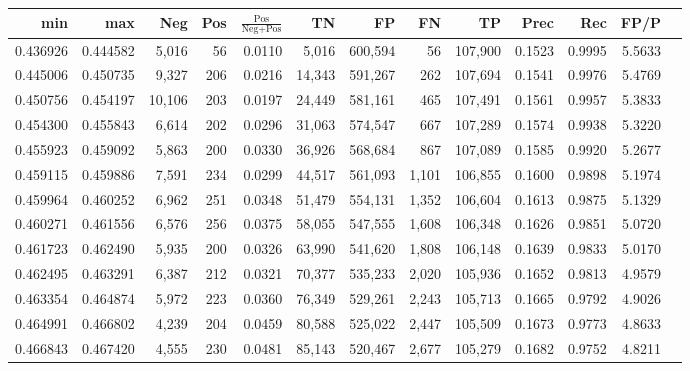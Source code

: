 \begin{tabular}{rrrrrrrrrrrrr}
\toprule
     min &      max &    Neg &   Pos & $\frac{\text{Pos}}{\text{Neg}+\text{Pos}}$ &      TN &      FP &      FN &      TP &   Prec &    Rec &   FP/P \\
\midrule
0.436926 & 0.444582 &  5,016 &    56 &                                     0.0110 &   5,016 & 600,594 &      56 & 107,900 & 0.1523 & 0.9995 & 5.5633 \\
0.445006 & 0.450735 &  9,327 &   206 &                                     0.0216 &  14,343 & 591,267 &     262 & 107,694 & 0.1541 & 0.9976 & 5.4769 \\
0.450756 & 0.454197 & 10,106 &   203 &                                     0.0197 &  24,449 & 581,161 &     465 & 107,491 & 0.1561 & 0.9957 & 5.3833 \\
0.454300 & 0.455843 &  6,614 &   202 &                                     0.0296 &  31,063 & 574,547 &     667 & 107,289 & 0.1574 & 0.9938 & 5.3220 \\
0.455923 & 0.459092 &  5,863 &   200 &                                     0.0330 &  36,926 & 568,684 &     867 & 107,089 & 0.1585 & 0.9920 & 5.2677 \\
0.459115 & 0.459886 &  7,591 &   234 &                                     0.0299 &  44,517 & 561,093 &   1,101 & 106,855 & 0.1600 & 0.9898 & 5.1974 \\
0.459964 & 0.460252 &  6,962 &   251 &                                     0.0348 &  51,479 & 554,131 &   1,352 & 106,604 & 0.1613 & 0.9875 & 5.1329 \\
0.460271 & 0.461556 &  6,576 &   256 &                                     0.0375 &  58,055 & 547,555 &   1,608 & 106,348 & 0.1626 & 0.9851 & 5.0720 \\
0.461723 & 0.462490 &  5,935 &   200 &                                     0.0326 &  63,990 & 541,620 &   1,808 & 106,148 & 0.1639 & 0.9833 & 5.0170 \\
0.462495 & 0.463291 &  6,387 &   212 &                                     0.0321 &  70,377 & 535,233 &   2,020 & 105,936 & 0.1652 & 0.9813 & 4.9579 \\
0.463354 & 0.464874 &  5,972 &   223 &                                     0.0360 &  76,349 & 529,261 &   2,243 & 105,713 & 0.1665 & 0.9792 & 4.9026 \\
0.464991 & 0.466802 &  4,239 &   204 &                                     0.0459 &  80,588 & 525,022 &   2,447 & 105,509 & 0.1673 & 0.9773 & 4.8633 \\
0.466843 & 0.467420 &  4,555 &   230 &                                     0.0481 &  85,143 & 520,467 &   2,677 & 105,279 & 0.1682 & 0.9752 & 4.8211 \\

\end{tabular}
